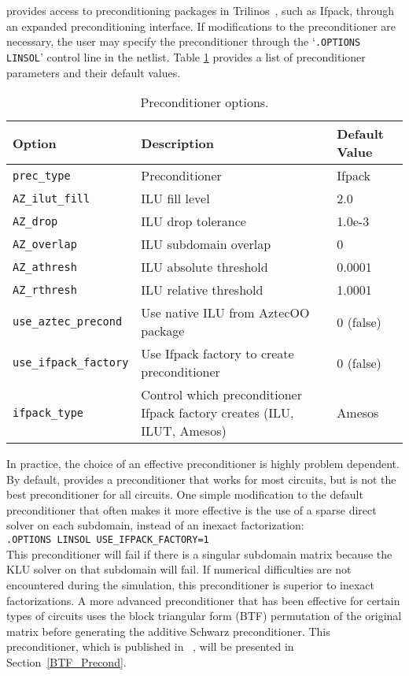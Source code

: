 \Xyce{} provides access to preconditioning packages in Trilinos~\cite{trilinos:toms}, 
such as Ifpack, through an expanded preconditioning interface.  
If modifications to the preconditioner are necessary, the user may specify the preconditioner 
through the `\texttt{.OPTIONS LINSOL}' control line in the netlist. 
Table \ref{tab:prec_options} provides a list of preconditioner parameters and
their default values.  

\begin{table}[htp]
\caption[Preconditioner options.]{Preconditioner options.}
\label{tab:prec_options}
\begin{center}
\begin{tabular}{| p{3.5cm} | p{8cm} | p{2.5cm} |}
\hline
Option & Description & Default Value \\
\hline
{\tt prec\_type}           & Preconditioner & Ifpack \\
{\tt AZ\_ilut\_fill}       & ILU fill level & 2.0 \\
{\tt AZ\_drop}             & ILU drop tolerance & 1.0e-3 \\
{\tt AZ\_overlap}          & ILU subdomain overlap & 0 \\
{\tt AZ\_athresh}          & ILU absolute threshold & 0.0001 \\
{\tt AZ\_rthresh}          & ILU relative threshold & 1.0001 \\
{\tt use\_aztec\_precond}  & Use native ILU from AztecOO package & 0 (false) \\
{\tt use\_ifpack\_factory} & Use Ifpack factory to create preconditioner & 0 (false) \\
{\tt ifpack\_type}         & Control which preconditioner Ifpack factory creates (ILU, ILUT, Amesos) & Amesos \\
\hline
\end{tabular}
\end{center}
\end{table}

In practice, the choice of an effective preconditioner is highly problem dependent.  By default,
\Xyce{} provides a preconditioner that works for most circuits, but is not the best preconditioner
for all circuits.  One simple modification to the default preconditioner that often makes it more
effective is the use of a sparse direct solver on each subdomain, instead of an inexact factorization: \\[0.5em] 
\noindent \verb|.OPTIONS LINSOL USE_IFPACK_FACTORY=1| \\[0.5em]
This preconditioner will fail if there is a singular subdomain matrix because the KLU solver on that subdomain will fail.
If numerical difficulties are not encountered during the simulation, this preconditioner is superior to inexact factorizations.
A more advanced preconditioner that has been effective for certain types of circuits uses the block triangular form (BTF)
permutation of the original matrix before generating the additive Schwarz preconditioner.  This preconditioner, which
is published in ~\cite{ICCAD09_precond}, will be presented in Section~\ref{BTF_Precond}.


